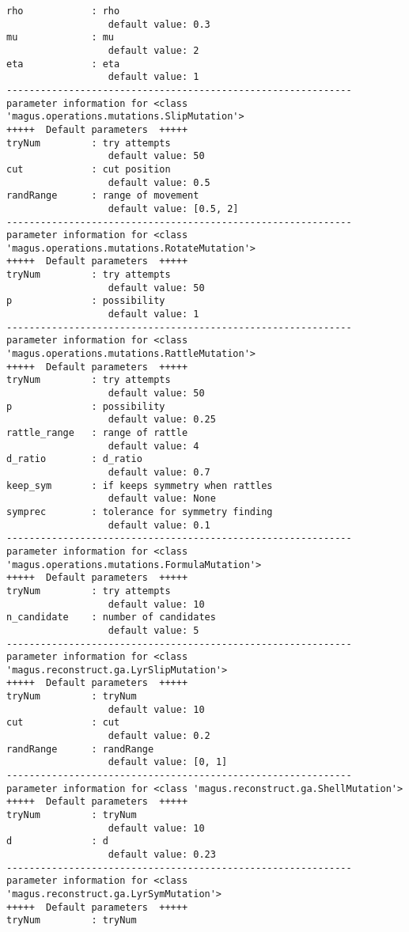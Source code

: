 \documentclass[12pt,oneside]{book}
\begin{document}
\begin{tcolorbox}
\begin{verbatim}
rho            : rho
                  default value: 0.3
mu             : mu
                  default value: 2
eta            : eta
                  default value: 1
-------------------------------------------------------------
parameter information for <class 'magus.operations.mutations.SlipMutation'>
+++++  Default parameters  +++++
tryNum         : try attempts
                  default value: 50
cut            : cut position
                  default value: 0.5
randRange      : range of movement
                  default value: [0.5, 2]
-------------------------------------------------------------
parameter information for <class 'magus.operations.mutations.RotateMutation'>
+++++  Default parameters  +++++
tryNum         : try attempts
                  default value: 50
p              : possibility
                  default value: 1
-------------------------------------------------------------
parameter information for <class 'magus.operations.mutations.RattleMutation'>
+++++  Default parameters  +++++
tryNum         : try attempts
                  default value: 50
p              : possibility
                  default value: 0.25
rattle_range   : range of rattle
                  default value: 4
d_ratio        : d_ratio
                  default value: 0.7
keep_sym       : if keeps symmetry when rattles
                  default value: None
symprec        : tolerance for symmetry finding
                  default value: 0.1
-------------------------------------------------------------
parameter information for <class 'magus.operations.mutations.FormulaMutation'>
+++++  Default parameters  +++++
tryNum         : try attempts
                  default value: 10
n_candidate    : number of candidates
                  default value: 5
-------------------------------------------------------------
parameter information for <class 'magus.reconstruct.ga.LyrSlipMutation'>
+++++  Default parameters  +++++
tryNum         : tryNum
                  default value: 10
cut            : cut
                  default value: 0.2
randRange      : randRange
                  default value: [0, 1]
-------------------------------------------------------------
parameter information for <class 'magus.reconstruct.ga.ShellMutation'>
+++++  Default parameters  +++++
tryNum         : tryNum
                  default value: 10
d              : d
                  default value: 0.23
-------------------------------------------------------------
parameter information for <class 'magus.reconstruct.ga.LyrSymMutation'>
+++++  Default parameters  +++++
tryNum         : tryNum

\end{verbatim}
\end{tcolorbox}
\end{document}
